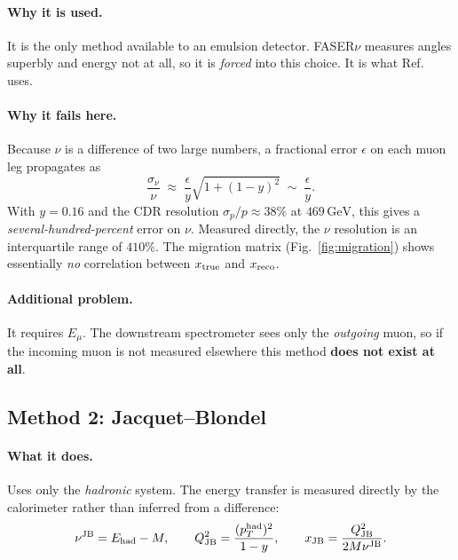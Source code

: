 \documentclass[11pt,a4paper]{article}
\newcommand{\Ein}{E_{\mu}}
\newcommand{\Ehad}{E_{\mathrm{had}}}
\newcommand{\GeV}{\,\mathrm{GeV}}
\begin{document}
\paragraph{Why it is used.} It is the only method available to an emulsion
detector. FASER$\nu$ measures angles superbly and energy not at all, so it is
\emph{forced} into this choice. It is what Ref.~\cite{francener} uses.

\paragraph{Why it fails here.} Because $\nu$ is a difference of two large
numbers, a fractional error $\epsilon$ on each muon leg propagates as
\begin{equation}
  \frac{\sigma_\nu}{\nu} \;\approx\; \frac{\epsilon}{y}\sqrt{1+(1-y)^2}
  \;\sim\; \frac{\epsilon}{y} .
\end{equation}
With $y=0.16$ and the CDR resolution $\sigma_p/p\approx38\%$ at $469\GeV$, this
gives a \emph{several-hundred-percent} error on $\nu$. Measured directly, the
$\nu$ resolution is an interquartile range of $410\%$. The migration matrix
(Fig.~\ref{fig:migration}) shows essentially \emph{no} correlation between
$x_{\rm true}$ and $x_{\rm reco}$.

\paragraph{Additional problem.} It requires $\Ein$. The downstream spectrometer
sees only the \emph{outgoing} muon, so if the incoming muon is not measured
elsewhere this method \textbf{does not exist at all}.

\subsection{Method 2: Jacquet--Blondel}
\label{sec:jb}

\paragraph{What it does.} Uses only the \emph{hadronic} system. The energy
transfer is measured directly by the calorimeter rather than inferred from a
difference:
\begin{equation}
  \nu^{\rm JB} = \Ehad - M,\qquad
  Q^2_{\rm JB} = \frac{(p_T^{\rm had})^2}{1-y},\qquad
  x_{\rm JB} = \frac{Q^2_{\rm JB}}{2M\nu^{\rm JB}} .
\end{equation}
\end{document}

